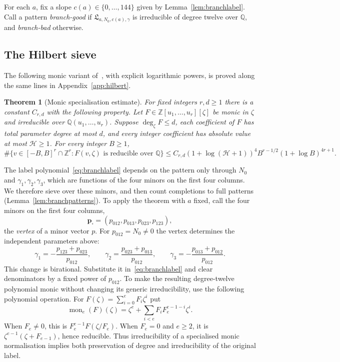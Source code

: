 \documentclass[11pt]{article}
\newtheorem{theorem}{Theorem}[section]
\theoremstyle{definition}
\theoremstyle{remark}
\begin{document}
For each $a$, fix a slope $c(a)\in\{0,\dots,144\}$ given by
Lemma~\ref{lem:branchlabel}. Call a pattern \emph{branch-good} if
$\mathfrak L_{a,N_0,c(a),\gamma}$ is irreducible of degree twelve over $\mathbb Q$, and
\emph{branch-bad} otherwise.

\subsection{The Hilbert sieve}

The following monic variant of~\cite[Theorem~1.10]{CDHNV}, with explicit
logarithmic powers, is proved along the same lines in Appendix~\ref{app:hilbert}.

\begin{theorem}[Monic specialisation estimate]\label{thm:monichilbert}
For fixed integers $r,d\ge1$ there is a constant $C_{r,d}$ with the following
property. Let $F\in\mathbb Z[u_1,\dots,u_r][\zeta]$ be monic in $\zeta$ and
irreducible over $\mathbb Q(u_1,\dots,u_r)$. Suppose
$\deg_\zeta F\le d$, each coefficient of $F$ has total parameter degree at most
$d$, and every integer coefficient has absolute value at most $\mathcal H\ge1$.
For every integer $B\ge1$,
\[
 \#\{v\in[-B,B]^r\cap\mathbb Z^r:
              F(v,\zeta)\text{ is reducible over }\mathbb Q\}
 \le C_{r,d}(1+\log(\mathcal H+1))^4 B^{r-1/2}(1+\log B)^{4r+1}.
\]
\end{theorem}

The label polynomial~\eqref{eq:branchlabel} depends on the pattern only through
$N_0$ and $\gamma_1,\gamma_2,\gamma_3$, which are functions of the four minors on the
first four columns. We therefore sieve over these minors, and then count completions
to full patterns (Lemma~\ref{lem:branchpatterns}). To apply the theorem with $a$
fixed, call the four minors on the first four columns,
\[
 \mathbf p_\square=(p_{012},p_{013},p_{023},p_{123}),
\]
the \emph{vertex} of a minor vector $p$. For $p_{012}=N_0\ne0$ the vertex
determines the independent parameters above:
\begin{equation}\label{eq:branchvertex}
 \gamma_1=-\frac{p_{123}+p_{023}}{p_{012}},\qquad
 \gamma_2=\frac{p_{023}+p_{013}}{p_{012}},\qquad
 \gamma_3=-\frac{p_{013}+p_{012}}{p_{012}}.
\end{equation}
This change is birational. Substitute it in~\eqref{eq:branchlabel} and
clear denominators by a fixed power of $p_{012}$. To make the resulting
degree-twelve polynomial monic without changing its generic irreducibility,
use the following polynomial operation. For $F(\zeta)=\sum_{i=0}^e F_i\zeta^i$ put
\[
 \operatorname{mon}_e(F)(\zeta)=\zeta^e+\sum_{i<e}F_i F_e^{e-1-i}\zeta^i.
\]
When $F_e\ne0$, this is $F_e^{e-1}F(\zeta/F_e)$.
When $F_e=0$ and $e\ge2$, it is $\zeta^{e-1}(\zeta+F_{e-1})$, hence reducible.
Thus irreducibility of a specialised monic normalisation implies both
preservation of degree and irreducibility of the original label.
\end{document}
